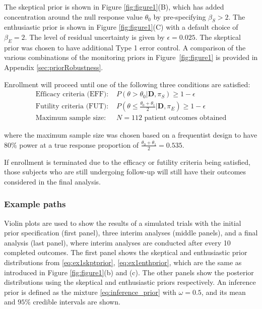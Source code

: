 \documentclass[12pt]{article}
\begin{document}
The skeptical prior is shown in Figure \ref{fig:figure1}(B), which has added concentration around the null response value $\theta_0$ by pre-specifying $\beta_S>2$. The enthusiastic prior is shown in Figure \ref{fig:figure1}(C) with a default choice of $\beta_E=2$. The level of residual uncertainty is given by $\epsilon=0.025$. The skeptical prior was chosen to have additional Type 1 error control. A comparison of the various combinations of the monitoring priors in Figure~\ref{fig:figure1} is provided in Appendix \ref{sec:priorRobustness}.

Enrollment will proceed until one of the following three conditions are satisfied:
\begin{align}
\text{Efficacy criteria (EFF): }&P(\theta>\theta_0|\mathbf{D},\pi_S)\geq 1-\epsilon \label{eq:ex1efficacy}\\
\text{Futility criteria (FUT): }&P\left(\theta\leq\frac{\theta_0+\theta_1}{2} \Big|\mathbf{D},\pi_E\right)\geq 1-\epsilon \label{eq:ex1futility}\\
\text{Maximum sample size: }&N=112 \text{ patient outcomes obtained}\label{eq:ex1maxss}
\end{align}

where the maximum sample size was chosen based on a frequentist design to have $80\%$ power at a true response proportion of $\frac{\theta_0+\theta_1}{2}=0.535$.

If enrollment is terminated due to the efficacy or futility criteria being satisfied, those subjects who are still undergoing follow-up will still have their outcomes considered in the final analysis.

\subsubsection{Example paths}
Violin plots are used to show the results of a simulated trials with the initial prior specification (first panel), three interim analyses (middle panels), and a final analysis (last panel), where interim analyses are conducted after every 10 completed outcomes. The first panel shows the skeptical and enthusiastic prior distributions from \eqref{eq:ex1skptprior}, \eqref{eq:ex1enthprior}, which are the same as introduced in Figure \ref{fig:figure1}(b) and (c). The other panels show the posterior distributions using the skeptical and enthusiastic priors respectively. An inference prior is defined as the mixture \eqref{eq:inference_prior} with $\omega=0.5$, and its mean and $95\%$ credible intervals are shown.
\end{document}
